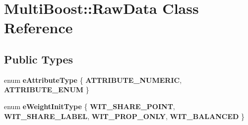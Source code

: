 \hypertarget{classMultiBoost_1_1RawData}{\section{Multi\-Boost\-:\-:Raw\-Data Class Reference}
\label{classMultiBoost_1_1RawData}
}
\subsection*{Public Types}
\begin{DoxyCompactItemize}
\item 
enum {\bfseries e\-Attribute\-Type} \{ {\bfseries A\-T\-T\-R\-I\-B\-U\-T\-E\-\_\-\-N\-U\-M\-E\-R\-I\-C}, 
{\bfseries A\-T\-T\-R\-I\-B\-U\-T\-E\-\_\-\-E\-N\-U\-M}
 \}
\item 
enum {\bfseries e\-Weight\-Init\-Type} \{ {\bfseries W\-I\-T\-\_\-\-S\-H\-A\-R\-E\-\_\-\-P\-O\-I\-N\-T}, 
{\bfseries W\-I\-T\-\_\-\-S\-H\-A\-R\-E\-\_\-\-L\-A\-B\-E\-L}, 
{\bfseries W\-I\-T\-\_\-\-P\-R\-O\-P\-\_\-\-O\-N\-L\-Y}, 
{\bfseries W\-I\-T\-\_\-\-B\-A\-L\-A\-N\-C\-E\-D}
 \}
\end{DoxyCompactItemize}
